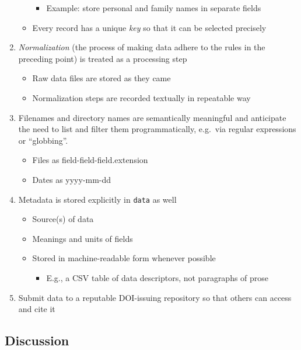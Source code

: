 \documentclass[10pt]{article}
\begin{document}
\begin{enumerate}
\begin{itemize}
    \begin{itemize}
      \item
      Example: store personal and family names in separate fields
    \end{itemize}
  \item
    Every record has a unique \emph{key} so that it can be selected
    precisely
  \end{itemize}
\item
  \emph{Normalization} (the process of making data adhere to the rules
  in the preceding point) is treated as a processing step

  \begin{itemize}
  \item
    Raw data files are stored as they came
  \item
    Normalization steps are recorded textually in repeatable way
  \end{itemize}
\item
  Filenames and directory names are semantically meaningful and
  anticipate the need to list and filter them programmatically, e.g.~via
  regular expressions or ``globbing''.

  \begin{itemize}
  \item
    Files as field-field-field.extension
  \item
    Dates as yyyy-mm-dd
  \end{itemize}
\item
  Metadata is stored explicitly in \texttt{data} as well

  \begin{itemize}
  \item
    Source(s) of data
  \item
    Meanings and units of fields
  \item
    Stored in machine-readable form whenever possible

    \begin{itemize}
      \item
      E.g., a CSV table of data descriptors, not paragraphs of prose
    \end{itemize}
  \end{itemize}
\item
  Submit data to a reputable DOI-issuing repository so that others can
  access and cite it
\end{enumerate}

\subsection*{Discussion}
\end{document}

